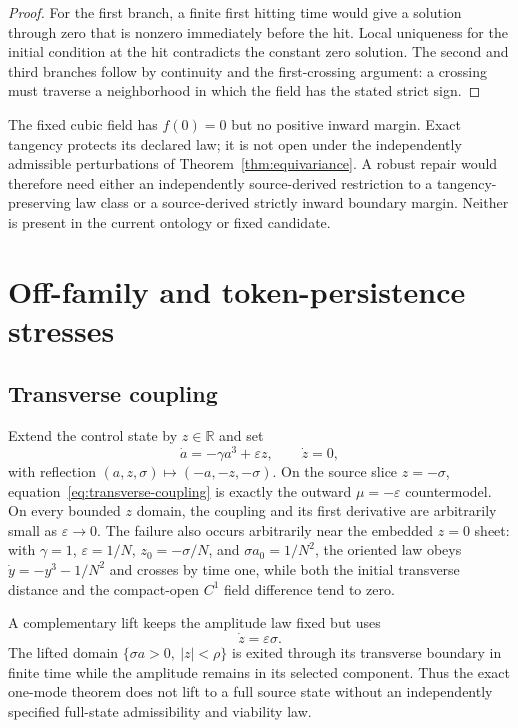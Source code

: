 \documentclass[11pt]{article}
\newcommand{\R}{\mathbb R}
\begin{document}
\begin{proof}
For the first branch, a finite first hitting time would give a solution
through zero that is nonzero immediately before the hit.  Local uniqueness
for the initial condition at the hit contradicts the constant zero solution.
The second and third branches follow by continuity and the first-crossing
argument: a crossing must traverse a neighborhood in which the field has the
stated strict sign.
\end{proof}

The fixed cubic field has $f(0)=0$ but no positive inward margin.  Exact
tangency protects its declared law; it is not open under the independently
admissible perturbations of Theorem~\ref{thm:equivariance}.  A robust repair
would therefore need either an independently source-derived restriction to a
tangency-preserving law class or a source-derived strictly inward boundary
margin.  Neither is present in the current ontology or fixed candidate.

\section{Off-family and token-persistence stresses}

\subsection{Transverse coupling}

Extend the control state by $z\in\R$ and set
\begin{equation}
 \dot a=-\gamma a^3+\varepsilon z,
 \qquad \dot z=0,
 \label{eq:transverse-coupling}
\end{equation}
with reflection $(a,z,\sigma)\mapsto(-a,-z,-\sigma)$.  On the source slice
$z=-\sigma$, equation~\eqref{eq:transverse-coupling} is exactly the outward
$\mu=-\varepsilon$ countermodel.  On every bounded $z$ domain, the coupling
and its first derivative are arbitrarily small as $\varepsilon\to0$.
The failure also occurs arbitrarily near the embedded $z=0$ sheet: with
$\gamma=1$, $\varepsilon=1/N$, $z_0=-\sigma/N$, and
$\sigma a_0=1/N^2$, the oriented law obeys
$\dot y=-y^3-1/N^2$ and crosses by time one, while both the initial transverse
distance and the compact-open $C^1$ field difference tend to zero.

A complementary lift keeps the amplitude law fixed but uses
\[
 \dot z=\varepsilon\sigma.
\]
The lifted domain $\{\sigma a>0,\ |z|<\rho\}$ is exited through its transverse
boundary in finite time while the amplitude remains in its selected component.
Thus the exact one-mode theorem does not lift to a full source state without
an independently specified full-state admissibility and viability law.
\end{document}
